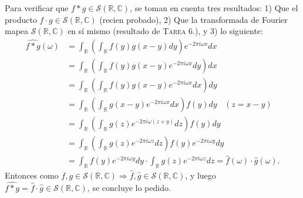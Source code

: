 \documentclass[spanish, fleqn]{article}
\begin{document}
\begin{description}
\begin{enumerate}
        Para verificar que $f * g \in \mathcal{S}(\mathbb{R},\mathbb{C})$, se toman en cuenta tres resultados: 1) Que el producto $f \cdot g \in \mathcal{S}(\mathbb{R},\mathbb{C})$ (recien probado), 2) Que la transformada de Fourier mapea $\mathcal{S}(\mathbb{R},\mathbb{C})$ en sí mismo (resultado de \textsc{Tarea 6.}), y 3) lo siguiente:
        \begin{align*}
            \widehat{f * g}(\omega) &= \int_{\mathbb{R}} \left( \int_{\mathbb{R}} f(y) g(x-y) dy \right) e^{-2 \pi i \omega x} dx \\
            &= \int_{\mathbb{R}} \left( \int_{\mathbb{R}} f(y) g(x-y) e^{-2 \pi i \omega x} dy \right) dx \\
            &=  \int_{\mathbb{R}} \left( \int_{\mathbb{R}} f(y) g(x-y) e^{-2 \pi i \omega x} dx \right) dy \\
            &= \int_{\mathbb{R}} \left( \int_{\mathbb{R}} g(x-y) e^{-2 \pi i \omega x} dx \right) f(y) dy \ \ \ \ (z = x-y) \\
            &= \int_{\mathbb{R}} \left( \int_{\mathbb{R}} g(z) e^{-2 \pi i \omega (z+y)} dz \right) f(y) dy \\
            &= \int_{\mathbb{R}} \left( \int_{\mathbb{R}} g(z) e^{-2 \pi i \omega z} dz \right) f(y) e^{-2 \pi i \omega y} dy \\
            &= \int_{\mathbb{R}} f(y) e^{-2 \pi i \omega y} dy \cdot \int_{\mathbb{R}} g(z) e^{-2 \pi i \omega z} dz = \widehat{f}(\omega) \cdot \widehat{g}(\omega).
        \end{align*}
        Entonces como $f,g \in  \mathcal{S}(\mathbb{R},\mathbb{C}) \Rightarrow \widehat{f},\widehat{g} \in  \mathcal{S}(\mathbb{R},\mathbb{C})$, y luego $\widehat{f * g} = \widehat{f}\cdot \widehat{g} \in  \mathcal{S}(\mathbb{R},\mathbb{C})$, se concluye lo pedido.


\end{enumerate}
\end{description}
\end{document}
